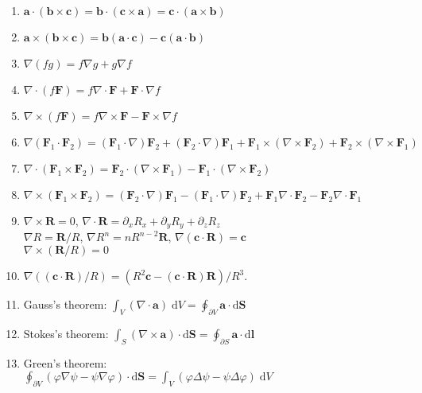 \documentclass{article}
\renewcommand\d{\mathrm d}
\begin{document}
\begin{multicols}{3}


    \begin{enumerate}
        \item $\bm a\cdot(\bm b\times\bm c)=\bm b\cdot(\bm c\times\bm a)=\bm c\cdot(\bm a\times\bm b)$
        \item $\bm a\times(\bm b\times\bm c)=\bm b(\bm a\cdot\bm c)-\bm c(\bm a\cdot\bm b)$
        \item $\nabla(fg)=f\nabla g+g\nabla f$
        \item $\nabla\cdot(f\bm F)=f\nabla\cdot\bm F+\bm F\cdot\nabla f$
        \item $\nabla\times(f\bm F)=f\nabla\times\bm F-\bm F\times\nabla f$
        \item $\nabla(\bm F_1\cdot\bm F_2)=(\bm F_1\cdot\nabla)\bm F_2+(\bm F_2\cdot\nabla)\bm F_1+\bm F_1\times(\nabla\times\bm F_2)+\bm F_2\times(\nabla\times\bm F_1)$
        \item $\nabla\cdot(\bm F_1\times\bm F_2)=\bm F_2\cdot(\nabla\times\bm F_1)-\bm F_1\cdot(\nabla\times\bm F_2)$
        \item $\nabla\times(\bm F_1\times\bm F_2)=(\bm F_2\cdot\nabla)\bm F_1-(\bm F_1\cdot\nabla)\bm F_2+\bm F_1\nabla\cdot\bm F_2-\bm F_2\nabla\cdot\bm F_1$
        \item $\nabla\times\bm R=0$, $\nabla\cdot\bm R=\partial_x R_x+\partial_y R_y+\partial_z R_z$\\ $\nabla R=\bm R/R$, $\nabla R^n=nR^{n-2}\bm R$, $\nabla(\bm c\cdot\bm R)=\bm c$\\
        $\nabla\times(\bm R/R)=0$
        \item $\nabla((\bm c\cdot\bm R)/R)=(R^2\bm c-(\bm c\cdot\bm R)\bm R)/R^3$.
        \item Gauss's theorem: $\int_V(\nabla\cdot\bm a)\;\d V=\oint_{\partial V}\bm a\cdot\d\bm S$
        \item Stokes's theorem: $\int_S(\nabla\times\bm a)\cdot\d\bm S=\oint_{\partial S}\bm a\cdot\d\bm l$
        \item Green's theorem:\\$\oint_{\partial V}(\varphi\nabla\psi-\psi\nabla\varphi)\cdot\d\bm S=\int_V(\varphi\Delta\psi-\psi\Delta\varphi)\;\d V$
    \end{enumerate}



\end{multicols}
\end{document}
